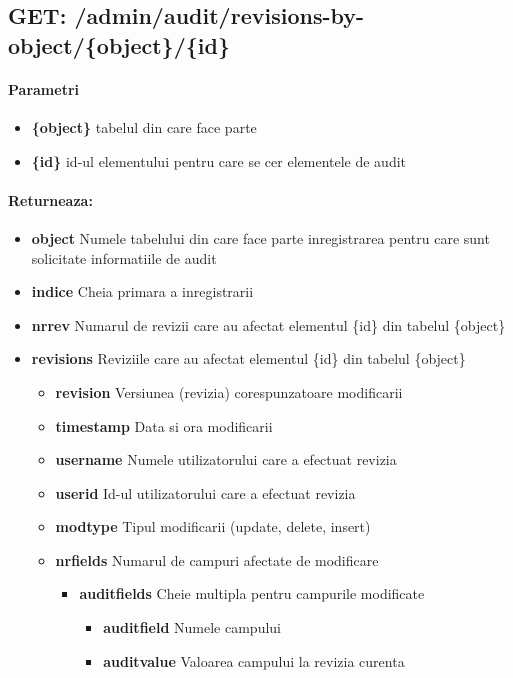  \subsection*{GET: /admin/audit/revisions-by-object/\{object\}/\{id\}}

\paragraph{Parametri}
\begin{itemize}
\item \textbf{\{object\}}
 tabelul din care face parte
\item \textbf{\{id\}}
 id-ul elementului pentru care se cer elementele de audit
 \end{itemize}
\paragraph{Returneaza:}
\begin{itemize}
\item \textbf{object}
 Numele tabelului din care face parte inregistrarea pentru care sunt solicitate informatiile de audit
\item \textbf{indice}
 Cheia primara a inregistrarii
\item \textbf{nrrev}
 Numarul de revizii care au afectat elementul \{id\} din tabelul \{object\}
\item\textbf{revisions}
 Reviziile care au afectat elementul \{id\} din tabelul \{object\} \begin{itemize}
\item \textbf{revision}
 Versiunea (revizia) corespunzatoare modificarii
\item \textbf{timestamp}
 Data si ora modificarii
\item \textbf{username}
 Numele utilizatorului care a efectuat revizia
\item \textbf{userid}
 Id-ul utilizatorului care a efectuat revizia
\item \textbf{modtype}
 Tipul modificarii (update, delete, insert)
\item\textbf{nrfields}
 Numarul de campuri afectate de modificare \begin{itemize}
\item\textbf{auditfields}
 Cheie multipla pentru campurile modificate \begin{itemize}
\item \textbf{auditfield}
 Numele campului
\item \textbf{auditvalue}
 Valoarea campului la revizia curenta
 \end{itemize}
 \end{itemize}
 \end{itemize}
 \end{itemize}
